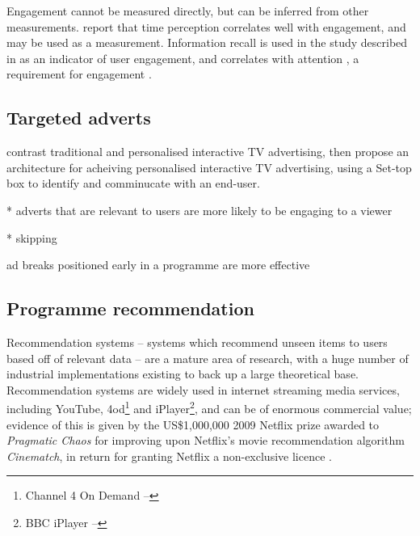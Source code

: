 	Engagement cannot be measured directly, but can be inferred from other measurements. \citet{time_perception} report that time perception correlates well with engagement, and may be used as a measurement. Information recall is used in the study described in \citep{advertising_engagement} as an indicator of user engagement, and correlates with attention \citep{interactions_attention_memory}, a requirement for engagement \cite{what_is_engagement}.

\subsection{Targeted adverts}

	\citet{personalised_interactive_tv_advertising} contrast traditional and personalised interactive TV advertising, then propose an architecture for acheiving personalised interactive TV advertising, using a Set-top box to identify and comminucate with an end-user.

	\citet{nettelhorst2012effects}
	* adverts that are relevant to users are more likely to be engaging to a viewer

	
	* skipping

	ad breaks positioned early in a programme are more effective \citep{jeong2011position}

\subsection{Programme recommendation}

	Recommendation systems -- systems which recommend unseen items to users based off of relevant data -- are a mature area of research, with a huge number of industrial implementations existing to back up a large theoretical base. Recommendation systems are widely used in internet streaming media services, including YouTube, 4od\footnote{Channel 4 On Demand -- } and iPlayer\footnote{BBC iPlayer -- }, and can be of enormous commercial value; evidence of this is given by the US\$1,000,000 2009 Netflix prize awarded to \textit{Pragmatic Chaos} for improving upon Netflix's movie recommendation algorithm \textit{Cinematch}, in return for granting Netflix a non-exclusive licence \citep{pragmatic_chaos}.

